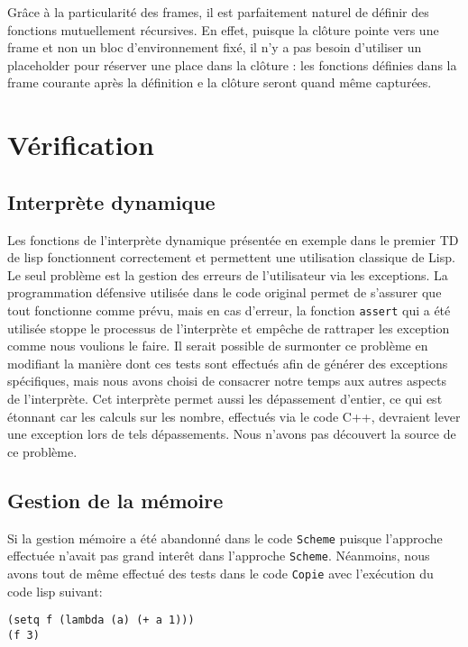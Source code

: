 \documentclass[a4paper,11pt]{article}
\begin{document}
Grâce à la particularité des frames, il est parfaitement naturel de définir des
fonctions mutuellement récursives. En effet, puisque la clôture pointe vers une
frame et non un bloc d'environnement fixé, il n'y a pas besoin d'utiliser un
placeholder pour réserver une place dans la clôture : les fonctions définies
dans la frame courante après la définition e la clôture seront quand même
capturées.

\section{Vérification}
 
 \subsection{Interprète dynamique}

 Les fonctions de l'interprète dynamique présentée en exemple dans le premier TD
 de lisp fonctionnent correctement et permettent 
 une utilisation classique de Lisp.  
 Le seul problème est la gestion des erreurs de 
 l'utilisateur via les exceptions. La programmation défensive utilisée dans le 
 code original permet de s'assurer que tout fonctionne comme prévu, mais en cas 
 d'erreur, la fonction \texttt{assert} qui a été utilisée stoppe le processus de 
 l'interprète et empêche de rattraper les exception comme nous voulions le faire.
 Il serait possible de surmonter ce problème en modifiant la manière dont ces 
 tests sont effectués afin de générer des exceptions spécifiques, mais nous avons 
 choisi de consacrer notre temps aux autres aspects de l'interprète.
 Cet interprète permet aussi les dépassement d'entier, ce qui est étonnant car 
 les calculs sur les nombre, effectués via le code C++, devraient lever une 
 exception lors de tels dépassements. Nous n'avons pas découvert la source de 
 ce problème.
 
\subsection{Gestion de la mémoire}

Si la gestion mémoire a été abandonné dans le code \texttt{Scheme} puisque l'approche
effectuée n'avait pas grand interêt dans l'approche \texttt{Scheme}. Néanmoins,
nous avons tout de même effectué des tests dans le code \texttt{Copie} avec
l'exécution du
code lisp suivant:

\begin{lstlisting}
(setq f (lambda (a) (+ a 1)))
(f 3)
\end{lstlisting}
\end{document}
